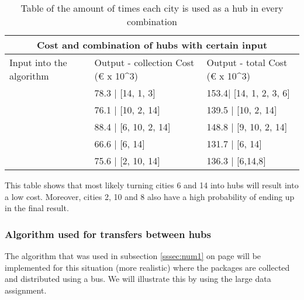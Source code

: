 \documentclass{article}
\begin{document}
             \begin{table}[h!]
                \begin{center}
                    \begin{tabular}{ |p{3cm}|p{3cm}|p{4cm}|}
                        \hline
                        \multicolumn{3}{|c|}{Cost and combination of hubs with certain input} \\
                        \hline
                        Input into the algorithm & Output -  collection Cost (€ x 10^3) & Output - total Cost (€ x 10^3)\\
                        \hline
                        [14] &  78.3 | [14, 1, 3] & 153.4| [14, 1, 2, 3, 6]  \\
                        \hline
                        [10] & 76.1 | [10, 2, 14]   & 139.5 | [10, 2, 14] \\
                        \hline
                        [9,10 ]& 88.4 | [6, 10, 2, 14] & 148.8 |  [9, 10, 2, 14]\\
                        \hline
                        [6, 14] &  66.6 | [6, 14]  &  131.7 | [6, 14] \\
                        \hline
                        [6, 14, 8] & 75.6 | [2, 10, 14] & 136.3 | [6,14,8]  \\
                        \hline
                    \end{tabular}
                \end{center}
            \caption{Table of the amount of times each city is used as a hub in every combination}
            \label{amount of times hubs are used in collection} 
            \end{table}
            
            This table shows that most likely turning cities 6 and 14 into hubs will result into a low cost. Moreover, cities 2, 10 and 8 also have a high probability of ending up in the final result.

    
        \subsubsection{Algorithm used for transfers between hubs}
            The algorithm that was used in subsection \ref{sssec:num1} on page \pageref{sssec:num1} will be implemented for this situation (more realistic) where the packages are collected and distributed using a bus. We will illustrate this by using the large data assignment. 
\end{document}
